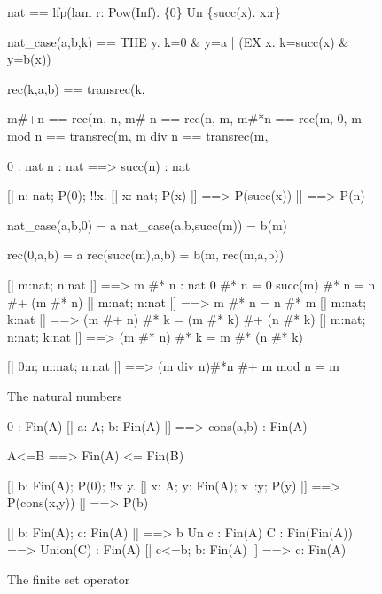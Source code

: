\begin{figure}
\begin{ttbox}
       nat == lfp(lam r: Pow(Inf). \{0\} Un \{succ(x). x:r\}

  nat_case(a,b,k) == 
              THE y. k=0 & y=a | (EX x. k=succ(x) & y=b(x))

       rec(k,a,b) ==  
              transrec(k, %

       m#+n == rec(m, n, %
      m#-n == rec(n, m, %
      m#*n == rec(m, 0, %
       m mod n == transrec(m, %
       m div n == transrec(m, %

        0 : nat
     n : nat ==> succ(n) : nat

    [| n: nat;  P(0);  !!x. [| x: nat;  P(x) |] ==> P(succ(x)) 
    |] ==> P(n)

    nat_case(a,b,0) = a
 nat_case(a,b,succ(m)) = b(m)

         rec(0,a,b) = a
      rec(succ(m),a,b) = b(m, rec(m,a,b))

     [| m:nat;  n:nat |] ==> m #* n : nat
        0 #* n = 0
     succ(m) #* n = n #+ (m #* n)
  [| m:nat;  n:nat |] ==> m #* n = n #* m
    [| m:nat;  k:nat |] ==> (m #+ n) #* k = (m #* k) #+ (n #* k)
    [| m:nat;  n:nat;  k:nat |] ==> (m #* n) #* k = m #* (n #* k)

    [| 0:n;  m:nat;  n:nat |] ==> (m div n)#*n #+ m mod n = m
\end{ttbox}
\caption{The natural numbers} \label{zf-nat}
\end{figure}

\begin{figure}
\begin{ttbox}
          0 : Fin(A)
       [| a: A;  b: Fin(A) |] ==> cons(a,b) : Fin(A)

        A<=B ==> Fin(A) <= Fin(B)

    [| b: Fin(A);
       P(0);
       !!x y. [| x: A;  y: Fin(A);  x~:y;  P(y) |] ==> P(cons(x,y))
    |] ==> P(b)

         [| b: Fin(A);  c: Fin(A) |] ==> b Un c : Fin(A)
      C : Fin(Fin(A)) ==> Union(C) : Fin(A)
      [| c<=b;  b: Fin(A) |] ==> c: Fin(A)
\end{ttbox}
\caption{The finite set operator} \label{zf-fin}
\end{figure}


